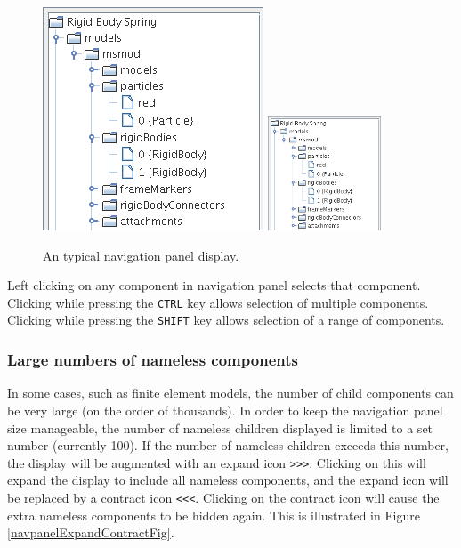\documentclass{article}
\begin{document}
\begin{figure}
\begin{center}
\iflatexml
\includegraphics[]{images/navpanel}
\else
\includegraphics[width=0.30\textwidth]{images/navpanel}
\fi
\end{center}
\caption{An typical navigation panel display.}%
\label{navpanelFig}
\end{figure}

Left clicking on any component in navigation panel selects that
component. Clicking while pressing the {\tt CTRL} key
allows selection of multiple components. Clicking while
pressing the {\tt SHIFT} key allows selection of a range of components.

\subsubsection{Large numbers of nameless components}

In some cases, such as finite element models, the number of child
components can be very large (on the order of thousands). In order to
keep the navigation panel size manageable, the number of nameless
children displayed is limited to a set number (currently 100).  If the
number of nameless children exceeds this number, the display will be
augmented with an expand icon {\tt >>>}. Clicking on this will expand the
display to include all nameless components, and the expand icon will
be replaced by a contract icon {\tt <<<}. Clicking on the contract icon
will cause the extra nameless components to be hidden again.
This is illustrated in Figure \ref{navpanelExpandContractFig}.
\end{document}
